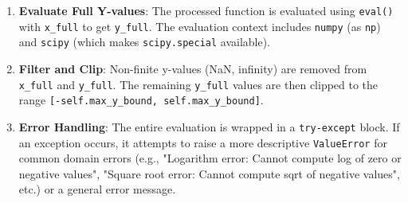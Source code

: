 \documentclass[12pt,a4paper]{report}
\begin{document}
\begin{itemize}
\begin{enumerate}
\begin{itemize}
                    \item For functions like \texttt{log} or \texttt{sqrt}, \texttt{x\_full} is generated using \texttt{np.logspace} for regions outside \texttt{x\_display} and concatenated with \texttt{x\_display}, focusing on positive values.
                    \item For \texttt{arcsin} or \texttt{arccos}, \texttt{x\_full} is generated using \texttt{np.linspace} strictly within the \texttt{[-1, 1]} domain.
                    \item For \texttt{gamma} or \texttt{beta}, \texttt{x\_full} uses \texttt{np.logspace} for positive values.
                    \item For other functions, \texttt{x\_full} is generated by concatenating \texttt{np.linspace} for ranges outside \texttt{self.display\_range} with \texttt{x\_display}, covering \texttt{self.full\_range}.
                    \item Duplicate x-values are removed using \texttt{np.unique(x\_full)}.
                \end{itemize}
            \item \textbf{Evaluate Full Y-values}: The processed function is evaluated using \texttt{eval()} with \texttt{x\_full} to get \texttt{y\_full}. The evaluation context includes \texttt{numpy} (as \texttt{np}) and \texttt{scipy} (which makes \texttt{scipy.special} available).
            \item \textbf{Filter and Clip}: Non-finite y-values (NaN, infinity) are removed from \texttt{x\_full} and \texttt{y\_full}. The remaining \texttt{y\_full} values are then clipped to the range \texttt{[-self.max\_y\_bound, self.max\_y\_bound]}.
            \item \textbf{Error Handling}: The entire evaluation is wrapped in a \texttt{try-except} block. If an exception occurs, it attempts to raise a more descriptive \texttt{ValueError} for common domain errors (e.g., "Logarithm error: Cannot compute log of zero or negative values", "Square root error: Cannot compute sqrt of negative values", etc.) or a general error message.
        \end{enumerate}
\end{itemize}
\end{document}
